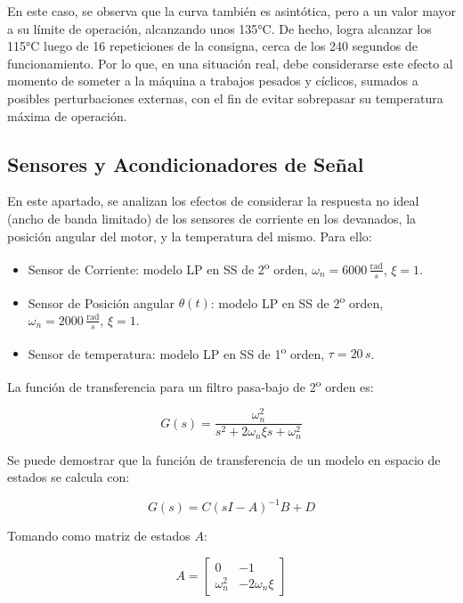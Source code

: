 \documentclass{article}
\begin{document}
En este caso, se observa que la curva también es asintótica, pero a un valor mayor a su límite de operación, alcanzando unos 135°C. De hecho, logra alcanzar los 115°C luego de 16 repeticiones de la consigna, cerca de los 240 segundos de funcionamiento. Por lo que, en una situación real, debe considerarse este efecto al momento de someter a la máquina a trabajos pesados y 
cíclicos, sumados a posibles perturbaciones externas, con el fin de evitar sobrepasar su temperatura máxima de operación.

\subsection{Sensores y Acondicionadores de Señal}

En este apartado, se analizan los efectos de considerar la respuesta no ideal (ancho de banda limitado) de los sensores de corriente en los devanados, la posici\'on angular del motor, y la temperatura del mismo. Para ello:

\begin{itemize}
    \item Sensor de Corriente: modelo LP en SS de 2\textsuperscript{o} orden, $\omega_n = 6000\,\frac{\text{rad}}{s}$, $\xi = 1$.
    \item Sensor de Posici\'on angular $\theta(t)$: modelo LP en SS de 2\textsuperscript{o} orden, $\omega_n = 2000\,\frac{\text{rad}}{s}$, $\xi = 1$.
    \item Sensor de temperatura: modelo LP en SS de 1\textsuperscript{o} orden, $\tau = 20\,s$.
\end{itemize}

La funci\'on de transferencia para un filtro pasa-bajo de 2\textsuperscript{o} orden es:

\begin{equation}
    G(s) = \frac{\omega_n^2}{s^2 + 2 \omega_n \xi s + \omega_n^2}
\end{equation}

Se puede demostrar que la funci\'on de transferencia de un modelo en espacio de estados se calcula con:

\begin{equation}
    G(s) = C (sI - A)^{-1} B + D
\end{equation}

Tomando como matriz de estados $A$:

\begin{equation}
    A = \begin{bmatrix}
        0 & -1 \\
        \omega_n^2 & -2 \omega_n \xi
    \end{bmatrix}
\end{equation}
\end{document}
